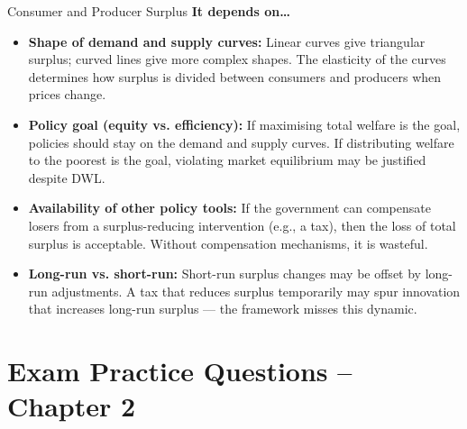 \documentclass[11pt, a4paper, twoside]{book}
\begin{document}
\begin{evaluation}{Consumer and Producer Surplus}
\textbf{It depends on\ldots}
\begin{itemize}[leftmargin=*, nosep]
\item \textbf{Shape of demand and supply curves:} Linear curves give triangular surplus; curved lines give more complex shapes. The elasticity of the curves determines how surplus is divided between consumers and producers when prices change.
\item \textbf{Policy goal (equity vs. efficiency):} If maximising total welfare is the goal, policies should stay on the demand and supply curves. If distributing welfare to the poorest is the goal, violating market equilibrium may be justified despite DWL.
\item \textbf{Availability of other policy tools:} If the government can compensate losers from a surplus-reducing intervention (e.g., a tax), then the loss of total surplus is acceptable. Without compensation mechanisms, it is wasteful.
\item \textbf{Long-run vs. short-run:} Short-run surplus changes may be offset by long-run adjustments. A tax that reduces surplus temporarily may spur innovation that increases long-run surplus — the framework misses this dynamic.
\end{itemize}
\end{evaluation}

\section{Exam Practice Questions -- Chapter 2}
\end{document}
